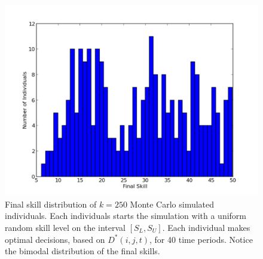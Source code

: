 \documentclass[12pt,letterpaper]{article}
\begin{document}
	\begin{figure}
	\caption{Final skill distribution of $k=250$ Monte Carlo simulated individuals. Each individuals starts the simulation with a uniform random skill level on the interval $[S_L,S_U]$. Each individual makes optimal decisions, based on $D^*(i,j,t)$, for 40 time periods. Notice the bimodal distribution of the final skills. }
	\begin{center}
	\includegraphics[width=150mm]{Fmcmc.pdf}
	\end{center}
	\label{Fmcmc}
	\end{figure}
\end{document}
